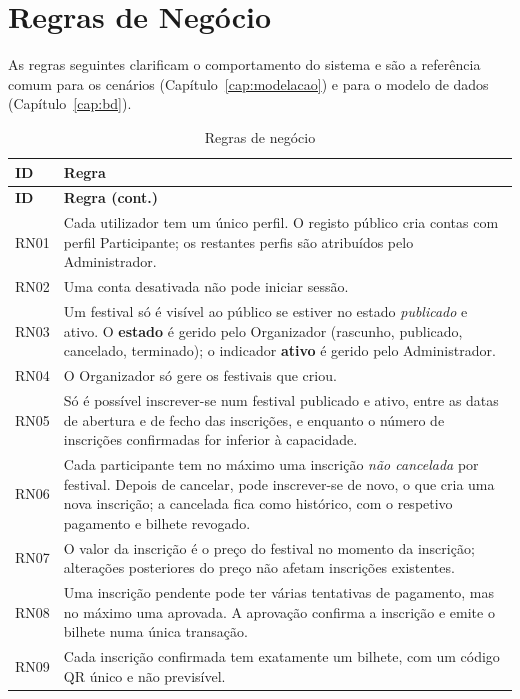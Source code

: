 \section{Regras de Negócio}
\label{sec:regras}

As regras seguintes clarificam o comportamento do sistema e são a referência
comum para os cenários (Capítulo~\ref{cap:modelacao}) e para o modelo de dados
(Capítulo~\ref{cap:bd}).

\begin{longtable}{|l|p{12.4cm}|}
\caption{Regras de negócio}\label{tab:rn}\\
\hline
\textbf{ID} & \textbf{Regra} \\ \hline
\endfirsthead
\hline
\textbf{ID} & \textbf{Regra (cont.)} \\ \hline
\endhead
RN01 & Cada utilizador tem um único perfil. O registo público cria contas com perfil Participante; os restantes perfis são atribuídos pelo Administrador. \\ \hline
RN02 & Uma conta desativada não pode iniciar sessão. \\ \hline
RN03 & Um festival só é visível ao público se estiver no estado \emph{publicado} e ativo. O \textbf{estado} é gerido pelo Organizador (rascunho, publicado, cancelado, terminado); o indicador \textbf{ativo} é gerido pelo Administrador. \\ \hline
RN04 & O Organizador só gere os festivais que criou. \\ \hline
RN05 & Só é possível inscrever-se num festival publicado e ativo, entre as datas de abertura e de fecho das inscrições, e enquanto o número de inscrições confirmadas for inferior à capacidade. \\ \hline
RN06 & Cada participante tem no máximo uma inscrição \emph{não cancelada} por festival. Depois de cancelar, pode inscrever-se de novo, o que cria uma nova inscrição; a cancelada fica como histórico, com o respetivo pagamento e bilhete revogado. \\ \hline
RN07 & O valor da inscrição é o preço do festival no momento da inscrição; alterações posteriores do preço não afetam inscrições existentes. \\ \hline
RN08 & Uma inscrição pendente pode ter várias tentativas de pagamento, mas no máximo uma aprovada. A aprovação confirma a inscrição e emite o bilhete numa única transação. \\ \hline
RN09 & Cada inscrição confirmada tem exatamente um bilhete, com um código QR único e não previsível. \\ \hline

\end{longtable}
